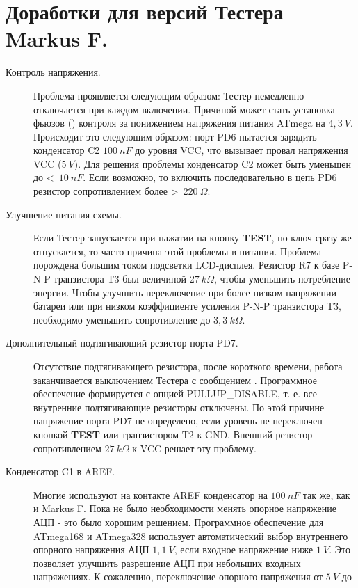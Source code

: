 \section{Доработки для версий Тестера Markus F.}
\label{sec:change_markus}
\begin{description}

\item[Контроль напряжения.]
Проблема проявляется следующим образом: Тестер немедленно отключается при каждом включении. Причиной может стать 
установка фьюзов () контроля за понижением напряжения питания ATmega на \(4,3~V\). Происходит это следующим 
образом: порт PD6 пытается зарядить конденсатор C2 \(100~nF\) до уровня VCC, что вызывает провал напряжения 
VCC (\(5~V\)). Для решения проблемы конденсатор C2 может быть уменьшен до \textless~\(10~nF\). Если возможно, 
то включить последовательно в цепь PD6  резистор сопротивлением более \textgreater~\(220~\Omega\).
\item[Улучшение питания схемы.]
Если Тестер запускается при нажатии на кнопку \textbf{ TEST}, но ключ сразу же отпускается, то часто причина этой проблемы 
в питании. Проблема порождена большим током подсветки LCD-дисплея. Резистор R7 к базе P-N-P-транзистора T3 был 
величиной \(27~k\Omega\), 
чтобы уменьшить потребление энергии. Чтобы улучшить переключение при  более низком напряжении батареи или при низком 
коэффициенте усиления P-N-P транзистора T3, необходимо уменьшить сопротивление до \(3,3~k\Omega\).
\item[Дополнительный подтягивающий резистор порта PD7.]
Отсутствие подтягивающего резистора, после короткого времени, работа заканчивается  выключением Тестера с сообщением 
. Программное обеспечение формируется с опцией PULLUP\_DISABLE, т. е. все внутренние подтягивающие резисторы 
отключены. По этой причине напряжение порта PD7 не определено, если уровень не переключен кнопкой \textbf{ TEST} или 
транзистором T2 к GND. Внешний резистор сопротивлением \(27~k\Omega\) к VCC решает эту проблему.
\item[Конденсатор C1 в AREF.]
Многие используют на контакте AREF конденсатор на \(100~nF\) так же, как и Markus F. Пока не было необходимости менять 
опорное напряжение АЦП - это было хорошим решением. Программное обеспечение для ATmega168 и ATmega328 использует 
автоматический выбор внутреннего опорного напряжения АЦП \(1,1~V\), если входное напряжение ниже \(1~V\). Это позволяет 
улучшить разрешение АЦП при небольших входных напряжениях. К сожалению, переключение опорного напряжения от \(5~V\) до 

\end{description}
